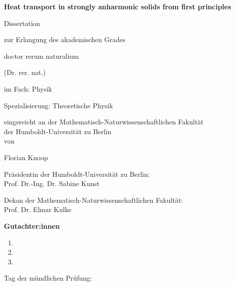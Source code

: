 \thispagestyle{empty}

\begin{fullwidth}
  \begin{center}
  \LARGE
  \textbf{Heat transport in strongly anharmonic solids from first principles}
  \\ \vspace{3em}
  
  \Large
  Dissertation 
  
  zur Erlangung des akademischen Grades 
  
  doctor rerum naturalium
  
  (Dr. rer. nat.)
  
  \vspace{3em}
    
  im Fach: Physik

Spezialisierung: Theoretische Physik 

\vspace{3em}

eingereicht an der Mathematisch-Naturwissenschaftlichen Fakultät \\
der Humboldt-Universität zu Berlin \\
von 

\vspace{3em} 

Florian Knoop 

\vspace{3em}

Präsidentin der Humboldt-Universität zu Berlin: \\ Prof. Dr.-Ing. Dr. Sabine Kunst 

\vspace{3em}

Dekan der Mathematisch-Naturwissenschaftlichen Fakultät: \\ Prof. Dr. Elmar Kulke

\vspace{3em}

\vfill
\textbf{Gutachter:innen}

\vspace{2em}

\begin{enumerate}
  \setlength\itemsep{1em}
  \item 
  \item 
  \item 
\end{enumerate}

\vspace{3em}	

\flushleft Tag der mündlichen Prüfung:

\end{center}
\end{fullwidth}

